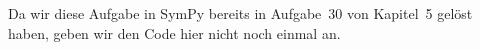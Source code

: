 \section{}

Da wir diese Aufgabe in SymPy bereits in Aufgabe~30 von Kapitel~5 gelöst haben, geben wir den Code hier nicht noch einmal an.
